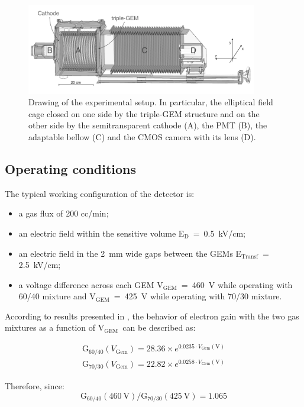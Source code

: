 \documentclass[a4paper,11pt]{article}
\newcommand{\Ed}  {E$_{\mathrm{D}}$}
\newcommand{\Et}  {E$_{\mathrm{Transf}}$}
\newcommand{\Vg}  {V$_{\mathrm{GEM}}$}
\begin{document}
\begin{figure}[ht]
\centering
\includegraphics[width=0.9\textwidth]{Figures/lemon.png}
\caption{Drawing of the experimental setup. In particular, the elliptical field cage closed on one side by the triple-GEM structure and on the other side by the semitransparent cathode (A), the PMT (B), the adaptable bellow (C) and the CMOS camera with its lens (D).} \label{fig:lemon}
\end{figure}

\subsection{Operating conditions}
\label{sec:oper}
The typical working configuration of the detector is: 
\begin{itemize}
    \item a gas flux of 200 cc/min;
    \item an electric field within the sensitive volume \Ed~=~0.5~kV/cm;
    \item an electric field in the 2~mm wide gaps between the GEMs \Et~= 2.5~kV/cm;
    \item a voltage difference across each GEM \Vg~=~460~V while operating with 60/40 mixture and \Vg~=~425~V while operating with 70/30 mixture.
\end{itemize}

According to results presented in \cite{bib:roby}, the behavior of electron gain with
the two gas mixtures as a function of \Vg\ can be described as:

\begin{eqnarray}
    {\mathrm{G}}_{60/40} (V_{\mathrm{Gem}}) = 28.36 \times e^{0.0235 \cdot V_{\mathrm{Gem}}\mathrm{(V)}} \\
    {\mathrm{G}}_{70/30} (V_{\mathrm{Gem}}) = 22.82 \times e^{0.0258 \cdot V_{\mathrm{Gem}}\mathrm{(V)}}
\end{eqnarray}

Therefore, since:
\begin{equation}
{\mathrm{G}}_{60/40}(460~\mathrm{V})/{\mathrm{G}}_{70/30}(425~\mathrm{V}) = 1.065
\end{equation}
\end{document}
